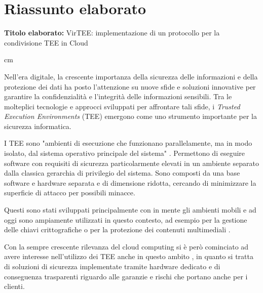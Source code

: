\documentclass[12pt,italian]{report}
\begin{document}
	
	\chapter*{Riassunto elaborato}
	
	
	\textbf{Titolo elaborato:} VirTEE: implementazione di un protocollo per la condivisione TEE in Cloud
	
	 cm
	
	Nell'era digitale, la crescente importanza della sicurezza delle informazioni e della protezione dei dati ha posto l'attenzione su nuove sfide e soluzioni innovative per garantire la confidenzialità e l'integrità delle informazioni sensibili. Tra le molteplici tecnologie e approcci sviluppati per affrontare tali sfide, i \textit{Trusted Execution Environments} (TEE) emergono come uno strumento importante per la sicurezza informatica.
	
	I TEE sono "ambienti di esecuzione che funzionano parallelamente, ma in modo isolato, dal sistema operativo principale del sistema" \cite{gp2020systemarchitecture}. Permettono di eseguire software con requisiti di sicurezza particolarmente elevati in un ambiente separato dalla classica gerarchia di privilegio del sistema. Sono composti da una base software e hardware separata e di dimensione ridotta, cercando di minimizzare la superficie di attacco per possibili minacce.
	
	\medbreak
	
	Questi sono stati sviluppati principalmente con in mente gli ambienti mobili e ad oggi sono ampiamente utilizzati in questo contesto, ad esempio per la gestione delle chiavi crittografiche \cite{androidkeystore} o per la protezione dei contenuti multimediali \cite{widevine} \cite{playready}.
	
	Con la sempre crescente rilevanza del cloud computing si è però cominciato ad avere interesse nell'utilizzo dei TEE anche in questo ambito \cite{demigha2021hardware} \cite{dai2010tee}, in quanto si tratta di soluzioni di sicurezza implementate tramite hardware dedicato e di conseguenza trasparenti riguardo alle garanzie e rischi che portano anche per i clienti.
	
\end{document}
